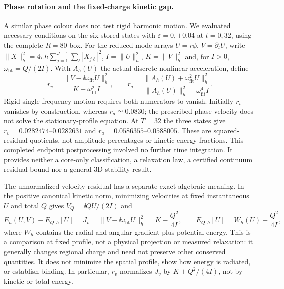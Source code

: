 \paragraph{Phase rotation and the fixed-charge kinetic gap.}
A similar phase colour does not test rigid harmonic motion. We evaluated
necessary conditions on the six stored states with $\varepsilon=0,\pm0.04$
at $t=0,32$, using the complete $R=80$ box. For the reduced mode arrays
$U=r\phi$, $V=\partial_t U$, write
$\|X\|_h^2=4\pi h\sum_{j=1}^{J-1}\sum_\ell|X_{j\ell}|^2$,
$I=\|U\|_h^2$, $K=\|V\|_h^2$ and, for $I>0$,
$\omega_{\mathrm{fit}}=Q/(2I)$.
With $A_h(U)$ the actual discrete nonlinear acceleration, define
\[
 r_v=\frac{\|V-\ii\omega_{\mathrm{fit}}U\|_h^2}{K+\omega_{\mathrm{fit}}^2 I},
 \qquad
 r_a=\frac{\|A_h(U)+\omega_{\mathrm{fit}}^2 U\|_h^2}
                 {\|A_h(U)\|_h^2+\omega_{\mathrm{fit}}^4 I}.
\]
Rigid single-frequency motion requires both numerators to vanish. Initially
$r_v$ vanishes by construction, whereas $r_a\simeq0.0830$; the prescribed
phase velocity does not solve the stationary-profile equation. At $T=32$
the three states give $r_v=0.0282474$--$0.0282631$ and
$r_a=0.0586355$--$0.0588005$. These are squared-residual quotients, not
amplitude percentages or kinetic-energy fractions. This completed endpoint
postprocessing involved no further time integration. It provides neither a core-only classification,
a relaxation law, a certified continuum residual bound nor a general 3D
stability result.

The unnormalized velocity residual has a separate exact algebraic meaning.
In the positive canonical kinetic norm, minimizing velocities at fixed
instantaneous $U$ and total $Q$ gives $V_Q=\ii Q U/(2I)$ and
\[
 E_h(U,V)-E_{Q,h}[U]
 =J_v=\|V-\ii\omega_{\mathrm{fit}}U\|_h^2
 =K-\frac{Q^2}{4I},\qquad
 E_{Q,h}[U]=W_h(U)+\frac{Q^2}{4I},
\]
where $W_h$ contains the radial and angular gradient plus potential energy.
This is a comparison at fixed profile, not a physical projection or measured
relaxation: it generally changes regional charge and need not preserve
other conserved quantities. It does not minimize the spatial profile,
show how energy is radiated, or establish binding. In particular, $r_v$
normalizes $J_v$ by $K+Q^2/(4I)$, not by kinetic or total energy.
